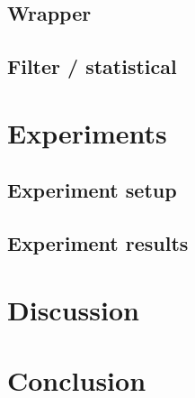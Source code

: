 \documentclass{article}
\begin{document}
    \subsection{Wrapper}
    \subsection{Filter / statistical}

\section{Experiments}
\subsection{Experiment setup}
\subsection{Experiment results}
\section{Discussion}
\section{Conclusion}
\citep{chen_kernel_2018}




\begin{appendices}

\end{appendices}
\end{document}
